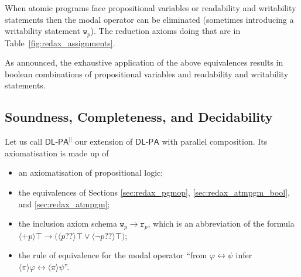 \documentclass{llncs}
\newcommand{\pll}{ {||} }							%
\newcommand{\readable}[1]{\mathtt{r}_{#1}}
\newcommand{\writable}[1]{\mathtt{w}_{#1}}
\newcommand{\testendo}{?\!\!?}			%
\newcommand{\Dlpa}{\ensuremath{\mathsf{DL\text{-}PA}}\xspace}
\newcommand{\DlpaPll}{\ensuremath{\mathsf{DL\text{-}PA}^\pll}\xspace}
\newcommand{\assgntopV}[1]{{\mathtt {+} #1}}
\newcommand{\assgnbotV}[1]{{\mathtt {-} #1}}
\newcommand{\ldia}[1]{ \big\langle #1 \big\rangle}
\newcommand{\leqv}{ \leftrightarrow }
\newcommand{\limp}{ \rightarrow }
\renewcommand{\phi}{\varphi}
\begin{document}
When atomic programs face propositional variables or readability and writability statements 
then the modal operator can be eliminated (sometimes introducing a writability statement $\writable{p}$). 
The reduction axioms doing that are in Table~\ref{fig:redax_assignments}.

As announced, the exhaustive application of the above equivalences results in boolean combinations of 
propositional variables and readability and writability statements. 

\subsection{Soundness, Completeness, and Decidability} 

Let us call \DlpaPll our extension of \Dlpa with parallel composition. 
Its axiomatisation is made up of 
\begin{itemize}
\item
an axiomatisation of propositional logic;
\item
the equivalences of Sections \ref{sec:redax_pgmop}, 
\ref{sec:redax_atmpgm_bool}, 
and \ref{sec:redax_atmpgm};
\item
the inclusion axiom schema $\writable{p} \limp \readable p$, which is an abbreviation of the formula
$\ldia{ \assgntopV p } \top \limp \big( \ldia{ p \testendo} \top \lor \ldia{ \lnot p \testendo} \top \big) $;
\item
the rule of equivalence for the modal operator %
``from $\phi \leqv \psi$ infer $\ldia \pi \phi \leqv \ldia \pi \psi $''.
\end{itemize}
\end{document}

